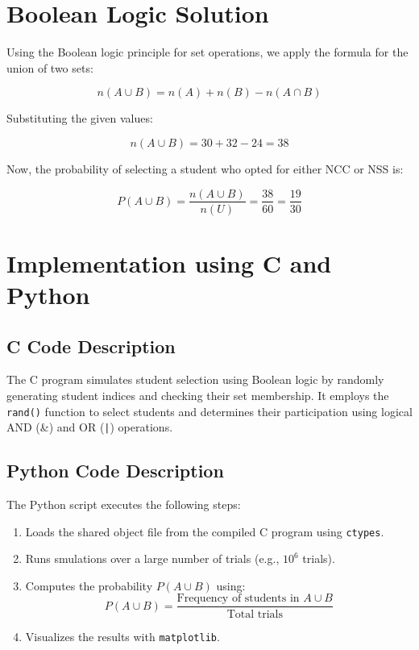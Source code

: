 \documentclass[journal]{IEEEtran}
\begin{document}
\section{\textbf{Boolean Logic Solution}}
Using the Boolean logic principle for set operations, we apply the formula for the union of two sets:

\begin{equation}
    n(A \cup B) = n(A) + n(B) - n(A \cap B)
\end{equation}

Substituting the given values:

\begin{equation}
    n(A \cup B) = 30 + 32 - 24 = 38
\end{equation}

Now, the probability of selecting a student who opted for either NCC or NSS is:

\begin{equation}
    P(A \cup B) = \frac{n(A \cup B)}{n(U)} = \frac{38}{60} = \frac{19}{30}
\end{equation}

\section{\textbf{Implementation using C and Python}}

\subsection{C Code Description}
The C program simulates student selection using Boolean logic by randomly generating student indices and checking their set membership. It employs the \texttt{rand()} function to select students and determines their participation using logical AND (\&) and OR (\texttt{|}) operations.

\subsection{Python Code Description}
The Python script executes the following steps:
\begin{enumerate}
    \item Loads the shared object file from the compiled C program using \texttt{ctypes}.
    \item Runs smulations over a large number of trials (e.g., $10^6$ trials).
    \item Computes the probability $P(A \cup B)$ using:
    \begin{equation}
        P(A \cup B) = \frac{\text{Frequency of students in } A \cup B}{\text{Total trials}}
    \end{equation}
    \item Visualizes the results with \texttt{matplotlib}.
\end{enumerate}
\end{document}
